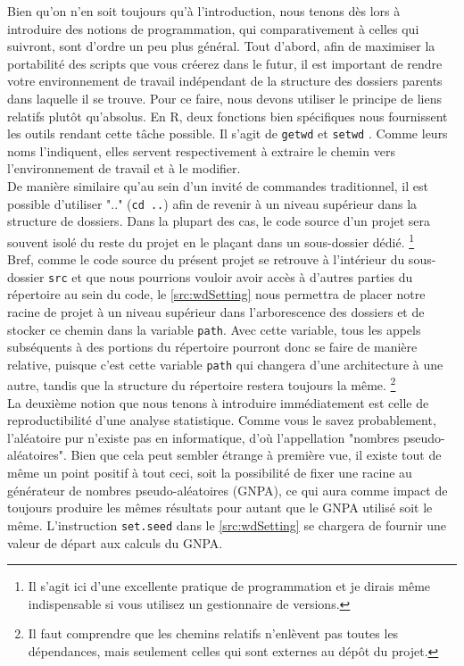 Bien qu'on n'en soit toujours qu'à l'introduction, nous tenons dès lors à introduire des notions de programmation, qui comparativement à celles qui suivront, sont d'ordre un peu plus général. Tout d'abord, afin de maximiser la portabilité des scripts que vous créerez dans le futur, il est important de rendre votre environnement de travail indépendant de la structure des dossiers parents dans laquelle il se trouve. Pour ce faire, nous devons utiliser le principe de liens relatifs plutôt qu'absolus. En R, deux fonctions bien spécifiques nous fournissent les outils rendant cette tâche possible. Il s'agit de \texttt{getwd} et \texttt{setwd} \cite{Rfunction:setwd}. Comme leurs noms l'indiquent, elles servent respectivement à extraire le chemin vers l'environnement de travail et à le modifier. \\

De manière similaire qu'au sein d'un invité de commandes traditionnel, il est possible d'utiliser ".." (\texttt{cd ..}) afin de revenir à un niveau supérieur dans la structure de dossiers. Dans la plupart des cas, le code source d'un projet sera souvent isolé du reste du projet en le plaçant dans un sous-dossier dédié. \footnote{Il s'agit ici d'une excellente pratique de programmation et je dirais même indispensable si vous utilisez un gestionnaire de versions.} \\

Bref, comme le code source du présent projet se retrouve à l'intérieur du sous-dossier \texttt{src} \cite{repo:RAQ} et que nous pourrions vouloir avoir accès à d'autres parties du répertoire au sein du code, le \autoref{src:wdSetting} nous permettra de placer notre racine de projet à un niveau supérieur dans l'arborescence des dossiers et de stocker ce chemin dans la variable \texttt{path}. Avec cette variable, tous les appels subséquents à des portions du répertoire pourront donc se faire de manière relative, puisque c'est cette variable \texttt{path} qui changera d'une architecture à une autre, tandis que la structure du répertoire restera toujours la même. \footnote{Il faut comprendre que les chemins relatifs n'enlèvent pas toutes les dépendances, mais seulement celles qui sont externes au dépôt du projet.} \\

La deuxième notion que nous tenons à introduire immédiatement est celle de reproductibilité d'une analyse statistique. Comme vous le savez probablement, l'aléatoire pur n'existe pas en informatique, d'où l'appellation "nombres pseudo-aléatoires". Bien que cela peut sembler étrange à première vue, il existe tout de même un point positif à tout ceci, soit la possibilité de fixer une racine au générateur de nombres pseudo-aléatoires (GNPA), ce qui aura comme impact de toujours produire les mêmes résultats pour autant que le GNPA utilisé soit le même. L'instruction \texttt{set.seed} \cite{Rfunction:setseed} dans le \autoref{src:wdSetting} se chargera de fournir une valeur de départ aux calculs du GNPA. \\

